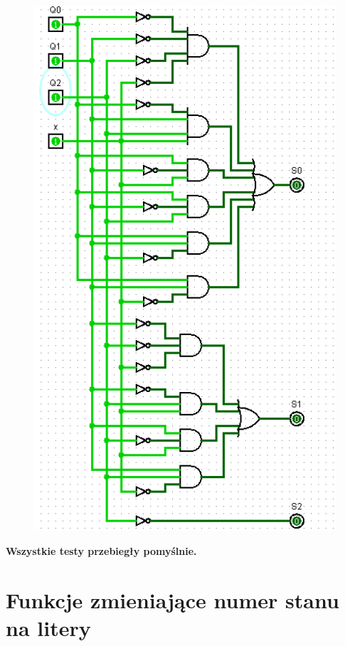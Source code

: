 \documentclass[]{article}
\begin{document}
\begin{minipage}{0.5\textwidth}
\begin{figure}[H]
	\centering
	\includegraphics[width=1\textwidth]{test1_7.png}
\end{figure}
\end{minipage}
\begin{center}
\textbf{Wszystkie testy przebiegły pomyślnie.}
\end{center}
\section{Funkcje zmieniające numer stanu na litery}
\end{document}
